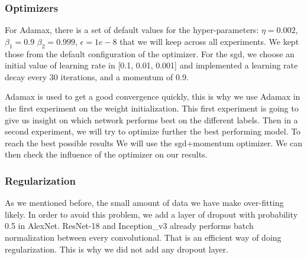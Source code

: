 \subsubsection{Optimizers}
For Adamax, there is a set of default values for the hyper-parameters: \(\eta = 0.002\), \(\beta_1 = 0.9\) \(\beta_2 = 0.999\), \(\epsilon = 1e-8\) that we will keep across all experiments. We kept those from the default configuration of the optimizer. 
For the \gls{sgd}, we choose an initial value of learning rate in [0.1, 0.01, 0.001] and implemented a learning rate decay every 30 iterations, and a momentum of 0.9. 

Adamax is used to get a good convergence quickly, this is why we use Adamax in the first experiment on the weight initialization. This first experiment is going to give us insight on which network performs best on the different labels. Then in a second experiment, we will try to optimize further the best performing model. To reach the best possible results We will use the \gls{sgd}+momentum optimizer. We can then check the influence of the optimizer on our results. 

\subsubsection{Regularization}
As we mentioned before, the small amount of data we have make \gls{over-fitting} likely. In order to avoid this problem, we add a layer of dropout with probability 0.5 in AlexNet. ResNet-18 and Inception\_v3 already performs batch normalization between every convolutional. That is an efficient way of doing regularization. This is why we did not add any dropout layer.  